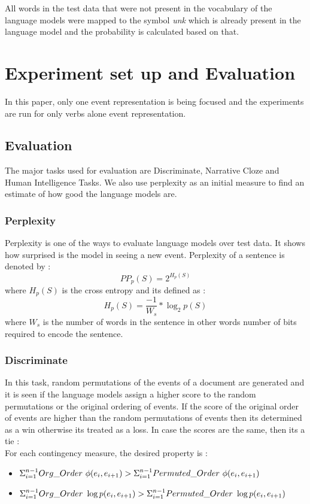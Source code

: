 \documentclass[12pt]{article}
\begin{document}
All words in the test data that were not present in the vocabulary of the language models were mapped to the symbol \textit{unk} which is already present in the language model and the probability is calculated based on that.


\section{Experiment set up and Evaluation}
In this paper, only one event representation is being focused and the experiments are run for only verbs alone event representation.
\subsection{Evaluation}
The major tasks used for evaluation are Discriminate, Narrative Cloze and Human Intelligence Tasks. We also use perplexity as an initial measure to find an estimate of how good the language models are.\\
\subsubsection{Perplexity}
Perplexity is one of the ways to evaluate language models over test data. It shows how surprised is the model in seeing a new event. Perplexity of a sentence is denoted by :
\begin{equation}
PP_p(S) = 2^{H_p(S)}
\end{equation}
where $H_p(S)$ is the cross entropy and its defined as :
\begin{equation}
H_p(S) = \frac{-1}{W_s} * \log_2 p(S)
\end{equation}
where $W_s$ is the number of words in the sentence in other words number of bits required to encode the sentence.  \\

\subsubsection{Discriminate}
In this task, random permutations of the events of a document are generated and it is seen if the language models assign a higher score to the random permutations or the original ordering of events. If the score of the original order of events are higher than the random permutations of events then its determined as a win otherwise its treated as a loss. In case the scores are the same, then its a tie : \\
For each contingency measure, the desired property is : 
\begin{itemize}
	\item $\Sigma_{i=1}^{n-1}Org\_Order \ \phi(e_i,e_{i+1})   > \\ \Sigma_{i=1}^{n-1} Permuted\_Order \ \phi(e_i,e_{i+1})$
	\item $\Sigma_{i=1}^{n-1}Org\_Order \ \log p(e_i,e_{i+1})   > \\ \Sigma_{i=1}^{n-1} Permuted\_Order \ \log p(e_i,e_{i+1})$
\end{itemize}
\end{document}
